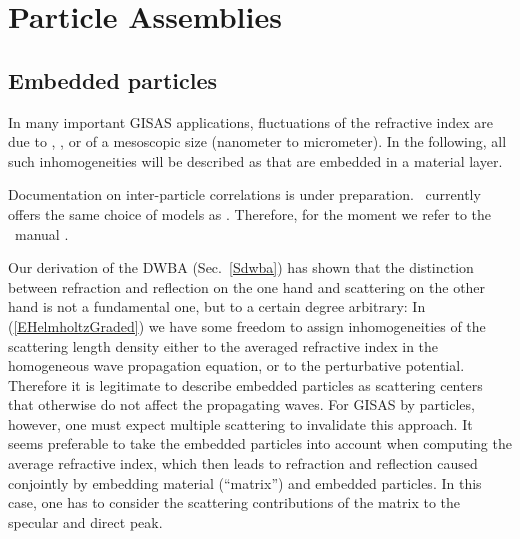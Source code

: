 

\chapter{Particle Assemblies}  \label{sec:Assemblies}


\section{Embedded particles}

%
%
%
In many important GISAS applications,
fluctuations of the refractive index are due to
, ,  or 
%
%
%
%
of a mesoscopic size (nanometer to micrometer).
In the following, all such inhomogeneities will be described as
 that are embedded in a material layer.

\Work
{Documentation on inter-particle correlations is under preparation.
\BornAgain\ currently offers the same choice of models as \IsGISAXS.
Therefore, for the moment we refer to the \IsGISAXS\ manual \cite{Laz08}.}

Our derivation of the DWBA (Sec.~\ref{Sdwba}) has shown
that the distinction between refraction and reflection on the one hand
and scattering on the other hand is not a fundamental one,
but to a certain degree arbitrary:
In (\ref{EHelmholtzGraded}) we have some freedom to assign
inhomogeneities of the scattering length density
either to the averaged refractive index in the
homogeneous wave propagation equation,
or to the perturbative potential.
Therefore it is legitimate
to describe  embedded particles
as scattering centers that otherwise do not affect the propagating waves.
For GISAS by  particles, however,
one must expect multiple scattering to invalidate this approach.
It seems preferable to take the embedded particles into account
when computing the average refractive index,
which then leads to refraction and reflection caused conjointly
by embedding material (``matrix'') and embedded particles.
%
In this case, one has to consider the scattering contributions of
the matrix to the specular and direct peak.


